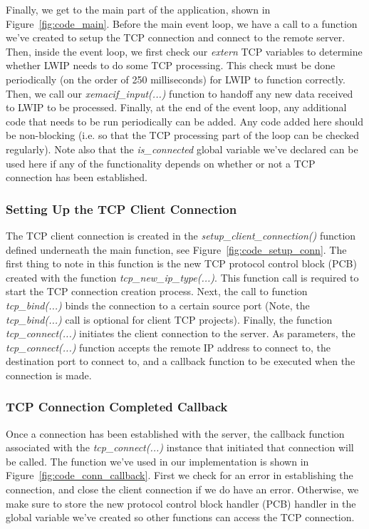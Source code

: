 \documentclass[11pt]{article}
\begin{document}
Finally, we get to the main part of the application, shown in Figure~\ref{fig:code_main}. Before the main event loop, we have a call to a function we've created to setup the TCP connection and connect to the remote server. Then, inside the event loop, we first check our \textit{extern} TCP variables to determine whether LWIP needs to do some TCP processing. This check must be done periodically (on the order of 250 milliseconds) for LWIP to function correctly. Then, we call our \textit{xemacif\_input(...)} function to handoff any new data received to LWIP to be processed. Finally, at the end of the event loop, any additional code that needs to be run periodically can be added. Any code added here should be non-blocking (i.e. so that the TCP processing part of the loop can be checked regularly). Note also that the \textit{is\_connected} global variable we've declared can be used here if any of the functionality depends on whether or not a TCP connection has been established.

\subsubsection*{Setting Up the TCP Client Connection}
The TCP client connection is created in the \textit{setup\_client\_connection()} function defined underneath the main function, see Figure~\ref{fig:code_setup_conn}. The first thing to note in this function is the new TCP protocol control block (PCB) created with the function \textit{tcp\_new\_ip\_type(...)}. This function call is required to start the TCP connection creation process. Next, the call to function \textit{tcp\_bind(...)} binds the connection to a certain source port (Note, the \textit{tcp\_bind(...)} call is optional for client TCP projects). Finally, the function \textit{tcp\_connect(...)} initiates the client connection to the server. As parameters, the \textit{tcp\_connect(...)} function accepts the remote IP address to connect to, the destination port to connect to, and a callback function to be executed when the connection is made.

\subsubsection*{TCP Connection Completed Callback}
Once a connection has been established with the server, the callback function associated with the \textit{tcp\_connect(...)} instance that initiated that connection will be called. The function we've used in our implementation is shown in Figure~\ref{fig:code_conn_callback}. First we check for an error in establishing the connection, and close the client connection if we do have an error. Otherwise, we make sure to store the new protocol control block handler (PCB) handler in the global variable we've created so other functions can access the TCP connection.
\end{document}
